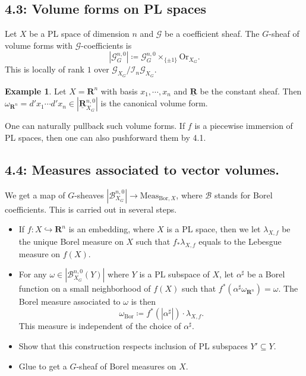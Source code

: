 \documentclass[12pt,reqno]{amsart}
\theoremstyle{definition}
\newtheorem{example}[theorem]{Example}
\theoremstyle{remark}
\theoremstyle{citedrem}
\theoremstyle{cited}
\theoremstyle{citeddef}
\theoremstyle{step}
\begin{document}
\subsection*{4.3: Volume forms on PL spaces}
Let $X$ be a PL space of dimension $n$ and $\mathcal{G}$ be a coefficient sheaf. The $G$-sheaf of volume forms with $\mathcal{G}$-coefficients is \[|\mathcal{G}^{n,0}_G| \coloneqq \mathcal{G}_G^{n,0} \times_{\{\pm 1\}}\mathrm{Or}_{X_G}.\] This is locally of rank $1$ over $\mathcal{G}_{X_G} / \mathcal{I}_n \mathcal{G}_{X_G}$. 

\begin{example}
    Let $X = \mathbf{R}^n$ with basis $x_1, \cdots, x_n$ and $\underline{\mathbf{R}}$ be the constant sheaf. Then $\omega_{\mathbf{R}^n} = d'x_1 \cdots d'x_n \in |\underline{\mathbf{R}}^{n,0}_{X_G}|$ is the canonical volume form.
\end{example}

One can naturally pullback such volume forms. If $f$ is a piecewise immersion of PL spaces, then one can also pushforward them by 4.1. 

\subsection*{4.4: Measures associated to vector volumes.}
We get a map of $G$-sheaves $|\mathcal{B}_{X_G}^{n,0}| \to \mathrm{Meas}_{\mathrm{Bor},X}$, where $\mathcal{B}$ stands for Borel coefficients. This is carried out in several steps. 

\begin{itemize}
    \item If $f \colon X \hookrightarrow \mathbf{R}^n$ is an embedding, where $X$ is a PL space, then we let $\lambda_{X,f}$ be the unique Borel measure on $X$ such that $f_* \lambda_{X,f}$ equals to the Lebesgue measure on $f(X)$. 
    \item For any $\omega \in |\mathcal{B}^{n,0}_{X_G}(Y)|$ where $Y$ is a PL subspace of $X$, let $\alpha^{\sharp}$ be a Borel function on a small neighborhood of $f(X)$ such that $f^*(\alpha^{\sharp} \omega_{\mathbf{R}^n}) = \omega.$ The Borel measure associated to $\omega$ is then \[\omega_{\mathrm{Bor}} \coloneqq f^*(|\alpha^{\sharp}|)\cdot \lambda_{X,f}.\] This measure is independent of the choice of $\alpha^{\sharp}$.
    \item Show that this construction respects inclusion of PL subspaces $Y' \subseteq Y$. 
    \item Glue to get a $G$-sheaf of Borel measures on $X$. 
\end{itemize}
\end{document}
